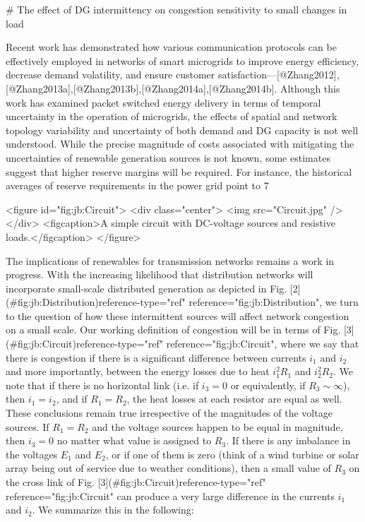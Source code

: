 # The effect of DG intermittency on congestion sensitivity to small changes in load

Recent work has demonstrated how various communication protocols can be effectively employed in networks of smart microgrids to improve energy efficiency, decrease demand volatility, and ensure customer satisfaction---[@Zhang2012],[@Zhang2013a],[@Zhang2013b],[@Zhang2014a],[@Zhang2014b]. Although this work has examined packet switched energy delivery in terms of temporal uncertainty in the operation of microgrids, the effects of spatial and network topology variability and uncertainty of both demand and DG capacity is not well understood. While the precise magnitude of costs associated with mitigating the uncertainties of renewable generation sources is not known, some estimates suggest that higher reserve margins will be required. For instance, the historical averages of reserve requirements in the power grid point to 7%

<figure id="fig:jb:Circuit"> <div class="center"> <img src="Circuit.jpg" /> </div> <figcaption>A simple circuit with DC-voltage sources and resistive loads.</figcaption> </figure>

The implications of renewables for transmission networks remains a work in progress. With the increasing likelihood that distribution networks will incorporate small-scale distributed generation as depicted in Fig. [2](#fig:jb:Distribution){reference-type="ref" reference="fig:jb:Distribution"}, we turn to the question of how these intermittent sources will affect network congestion on a small scale. Our working definition of congestion will be in terms of Fig. [3](#fig:jb:Circuit){reference-type="ref" reference="fig:jb:Circuit"}, where we say that there is congestion if there is a significant difference between currents $i_1$ and $i_2$ and more importantly, between the energy losses due to heat $i_1^2R_1$ and $i_2^2R_2$. We note that if there is no horizontal link (i.e. if $i_3=0$ or equivalently, if $R_3\sim\infty$), then $i_1=i_2$, and if $R_1=R_2$, the heat losses at each resistor are equal as well. These conclusions remain true irrespective of the magnitudes of the voltage sources. If $R_1=R_2$ and the voltage sources happen to be equal in magnitude, then $i_3=0$ no matter what value is assigned to $R_3$. If there is any imbalance in the voltages $E_1$ and $E_2$, or if one of them is zero (think of a wind turbine or solar array being out of service due to weather conditions), then a small value of $R_3$ on the cross link of Fig. [3](#fig:jb:Circuit){reference-type="ref" reference="fig:jb:Circuit"} can produce a very large difference in the currents $i_1$ and $i_2$. We summarize this in the following:

